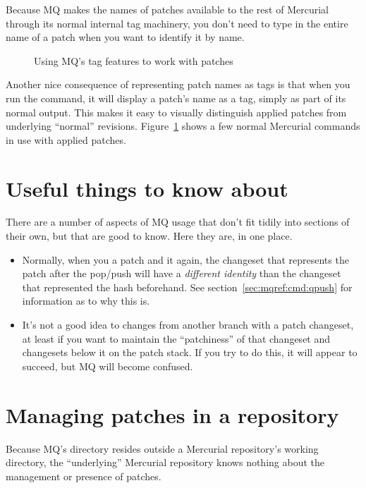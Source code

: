Because MQ makes the names of patches available to the rest of
Mercurial through its normal internal tag machinery, you don't need to
type in the entire name of a patch when you want to identify it by
name.

\begin{figure}[ht]
  \caption{Using MQ's tag features to work with patches}
  \label{ex:mq:id}
\end{figure}

Another nice consequence of representing patch names as tags is that
when you run the  command, it will display a patch's name
as a tag, simply as part of its normal output.  This makes it easy to
visually distinguish applied patches from underlying ``normal''
revisions.  Figure~\ref{ex:mq:id} shows a few normal Mercurial
commands in use with applied patches.

\section{Useful things to know about}

There are a number of aspects of MQ usage that don't fit tidily into
sections of their own, but that are good to know.  Here they are, in
one place.

\begin{itemize}
\item Normally, when you  a patch and  it
  again, the changeset that represents the patch after the pop/push
  will have a \emph{different identity} than the changeset that
  represented the hash beforehand.  See
  section~\ref{sec:mqref:cmd:qpush} for information as to why this is.
\item It's not a good idea to  changes from another
  branch with a patch changeset, at least if you want to maintain the
  ``patchiness'' of that changeset and changesets below it on the
  patch stack.  If you try to do this, it will appear to succeed, but
  MQ will become confused.
\end{itemize}

\section{Managing patches in a repository}
\label{sec:mq:repo}

Because MQ's  directory resides outside a
Mercurial repository's working directory, the ``underlying'' Mercurial
repository knows nothing about the management or presence of patches.

